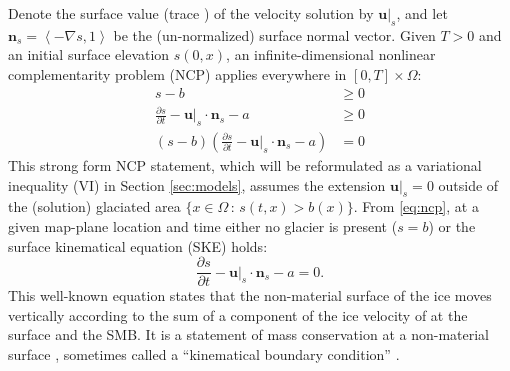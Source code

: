 \documentclass[hidelinks,onefignum,onetabnum,final]{siamart220329}  %
\newcommand{\grad}{\nabla}
\newcommand{\bn}{\mathbf{n}}
\newcommand{\bu}{\mathbf{u}}
\begin{document}
Denote the surface value (trace \cite{Evans2010}) of the velocity solution by $\bu|_s$, and let $\bn_s = \left<-\grad s,1\right>$ be the (un-normalized) surface normal vector.  Given $T>0$ and an initial surface elevation $s(0,x)$, an infinite-dimensional nonlinear complementarity problem (NCP) \cite{Bueler2021conservation,FacchineiPang2003,SchoofHewitt2013} applies everywhere in $[0,T]\times \Omega$:
\begin{subequations}
\label{eq:ncp}
\begin{align}
s - b &\ge 0 \\
\frac{\partial s}{\partial t} - \bu|_s \cdot \bn_s - a &\ge 0 \\
(s - b) \left(\frac{\partial s}{\partial t} - \bu|_s \cdot \bn_s - a\right) &= 0
\end{align}
\end{subequations}
This strong form NCP statement, which will be reformulated as a variational inequality (VI) \cite{KinderlehrerStampacchia1980} in Section \ref{sec:models}, assumes the extension $\bu|_s=0$ outside of the (solution) glaciated area $\{x\in\Omega\,:\,s(t,x)>b(x)\}$.  From \eqref{eq:ncp}, at a given map-plane location and time either no glacier is present ($s=b$) or the surface kinematical equation (SKE) holds:
\begin{equation}
\frac{\partial s}{\partial t} - \bu|_s \cdot \bn_s - a = 0.  \label{eq:ske}
\end{equation}
This well-known equation \cite{SchoofHewitt2013} states that the non-material surface of the ice moves vertically according to the sum of a component of the ice velocity of at the surface and the SMB.  It is a statement of mass conservation at a non-material surface \cite{Aschwandenetal2012}, sometimes called a ``kinematical boundary condition'' \cite{GreveBlatter2009}.
\end{document}

